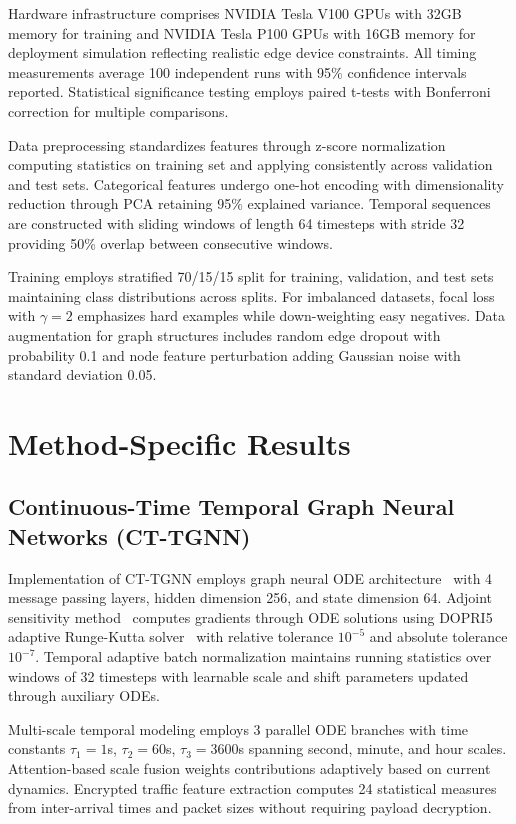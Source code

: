 Hardware infrastructure comprises NVIDIA Tesla V100 GPUs with 32GB memory for training and NVIDIA Tesla P100 GPUs with 16GB memory for deployment simulation reflecting realistic edge device constraints. All timing measurements average 100 independent runs with 95\% confidence intervals reported. Statistical significance testing employs paired t-tests with Bonferroni correction for multiple comparisons.

Data preprocessing standardizes features through z-score normalization computing statistics on training set and applying consistently across validation and test sets. Categorical features undergo one-hot encoding with dimensionality reduction through PCA retaining 95\% explained variance. Temporal sequences are constructed with sliding windows of length 64 timesteps with stride 32 providing 50\% overlap between consecutive windows.

Training employs stratified 70/15/15 split for training, validation, and test sets maintaining class distributions across splits. For imbalanced datasets, focal loss~\cite{lin2017focal} with $\gamma = 2$ emphasizes hard examples while down-weighting easy negatives. Data augmentation for graph structures includes random edge dropout with probability 0.1 and node feature perturbation adding Gaussian noise with standard deviation 0.05.

\section{Method-Specific Results}
\label{sec:impl_methods}

\subsection{Continuous-Time Temporal Graph Neural Networks (CT-TGNN)}

Implementation of CT-TGNN employs graph neural ODE architecture~\cite{chen2018neural} with 4 message passing layers, hidden dimension 256, and state dimension 64. Adjoint sensitivity method~\cite{chen2018neural} computes gradients through ODE solutions using DOPRI5 adaptive Runge-Kutta solver~\cite{dormand1980family} with relative tolerance $10^{-5}$ and absolute tolerance $10^{-7}$. Temporal adaptive batch normalization maintains running statistics over windows of 32 timesteps with learnable scale and shift parameters updated through auxiliary ODEs.

Multi-scale temporal modeling employs 3 parallel ODE branches with time constants $\tau_1 = 1$s, $\tau_2 = 60$s, $\tau_3 = 3600$s spanning second, minute, and hour scales. Attention-based scale fusion weights contributions adaptively based on current dynamics. Encrypted traffic feature extraction computes 24 statistical measures from inter-arrival times and packet sizes without requiring payload decryption.

